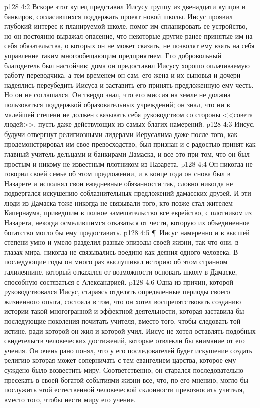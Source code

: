 \vs p128 4:2 Вскоре этот купец представил Иисусу группу из двенадцати купцов и банкиров, согласившихся поддержать проект новой школы. Иисус проявил глубокий интерес к планируемой школе, помог им спланировать ее устройство, но он постоянно выражал опасение, что некоторые другие ранее принятые им на себя обязательства, о которых он не может сказать, не позволят ему взять на себя управление таким многообещающим предприятием. Его добровольный благодетель был настойчив; дома он предоставил Иисусу хорошо оплачиваемую работу переводчика, а тем временем он сам, его жена и их сыновья и дочери надеялись переубедить Иисуса и заставить его принять предложенную ему честь. Но он не соглашался. Он твердо знал, что его миссия на земле не должна пользоваться поддержкой образовательных учреждений; он знал, что ни в малейшей степени не должен связывать себя руководством со стороны <<совета людей>>, пусть даже действующих из самых благих намерений.
\vs p128 4:3 Иисус, будучи отвергнут религиозными лидерами Иерусалима даже после того, как продемонстрировал им свое превосходство, был признан и с радостью принят как главный учитель дельцами и банкирами Дамаска, и все это при том, что он был простым и никому не известным плотником из Назарета.
\vs p128 4:4 Он никогда не говорил своей семье об этом предложении, и в конце года он снова был в Назарете и исполнял свои ежедневные обязанности так, словно никогда не подвергался искушению соблазнительных предложений дамасских друзей. И эти люди из Дамаска тоже никогда не связывали того, кто позже стал жителем Капернаума, приведшим в полное замешательство все еврейство, с плотником из Назарета, некогда осмелившимся отказаться от чести, которую их объединенное богатство могло бы ему предоставить.
\vs p128 4:5 \P\ Иисус намеренно и в высшей степени умно и умело разделил разные эпизоды своей жизни, так что они, в глазах мира, никогда не связывались воедино как деяния одного человека. В последующие годы он много раз выслушивал историю об этом странном галилеянине, который отказался от возможности основать школу в Дамаске, способную состязаться с Александрией.
\vs p128 4:6 Одна из причин, которой руководствовался Иисус, стараясь отделять определенные периоды своего жизненного опыта, состояла в том, что он хотел воспрепятствовать созданию истории такой многогранной и эффектной деятельности, которая заставила бы последующие поколения почитать учителя, вместо того, чтобы следовать той истине, ради которой он жил и которой учил. Иисус не хотел оставлять подобных свидетельств человеческих достижений, которые отвлекли бы внимание от его учения. Он очень рано понял, что у его последователей будет искушение создать религию  которая может соперничать с тем евангелием царства, которое ему суждено было возвестить миру. Соответственно, он старался последовательно пресекать в своей богатой событиями жизни все, что, по его мнению, могло бы послужить этой естественной человеческой склонности превозносить учителя, вместо того, чтобы нести миру его учение.
